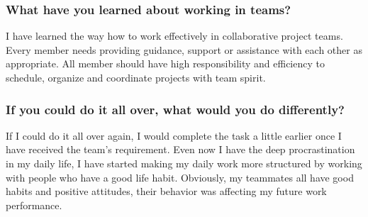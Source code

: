 \subsubsection{What have you learned about working in teams?}
\noindent I have learned the way how to work effectively in collaborative project teams. Every member needs providing guidance, support or assistance with each other as appropriate. All member should have high responsibility and efficiency to schedule, organize and coordinate projects with team spirit. \\

\subsubsection{If you could do it all over, what would you do differently?}
\noindent If I could do it all over again, I would complete the task a little earlier once I have received the team's requirement.  Even now I have the deep procrastination in my daily life, I have started making my daily work more structured by working with people who have a good life habit. Obviously, my teammates all have good habits and positive attitudes, their behavior was affecting my future work performance. \\